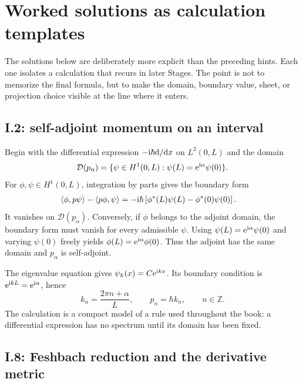 \section*{Worked solutions as calculation templates}

The solutions below are deliberately more explicit than the preceding hints.
Each one isolates a calculation that recurs in later Stages.  The point is not
to memorize the final formula, but to make the domain, boundary value, sheet,
or projection choice visible at the line where it enters.

\subsection*{I.2: self-adjoint momentum on an interval}

Begin with the differential expression $-\mathrm{i}\hbar\mathrm{d}/\mathrm{d} x$ on
$L^2(0,L)$ and the domain
\begin{equation}
  \mathcal D(p_\alpha)=
  \{\psi\in H^1(0,L):\psi(L)=\mathrm{e}^{\mathrm{i}\alpha}\psi(0)\}.
\end{equation}
For $\phi,\psi\in H^1(0,L)$, integration by parts gives the boundary form
\begin{align}
  \langle \phi,p\psi\rangle-\langle p\phi,\psi\rangle
  &=-\mathrm{i}\hbar
  \left[\phi^*(L)\psi(L)-\phi^*(0)\psi(0)\right].
\end{align}
It vanishes on $\mathcal D(p_\alpha)$.  Conversely, if $\phi$ belongs to the
adjoint domain, the boundary form must vanish for every admissible $\psi$.
Using $\psi(L)=\mathrm{e}^{\mathrm{i}\alpha}\psi(0)$ and varying $\psi(0)$ freely yields
$\phi(L)=\mathrm{e}^{\mathrm{i}\alpha}\phi(0)$.  Thus the adjoint has the same domain and
$p_\alpha$ is self-adjoint.

The eigenvalue equation gives $\psi_k(x)=C\mathrm{e}^{\mathrm{i} kx}$.  Its boundary
condition is $\mathrm{e}^{\mathrm{i} kL}=\mathrm{e}^{\mathrm{i}\alpha}$, hence
\begin{equation}
  k_n=\frac{2\pi n+\alpha}{L},
  \qquad
  p_n=\hbar k_n,
  \qquad n\in\mathbb Z .
\end{equation}
The calculation is a compact model of a rule used throughout the book: a
differential expression has no spectrum until its domain has been fixed.

\subsection*{I.8: Feshbach reduction and the derivative metric}


